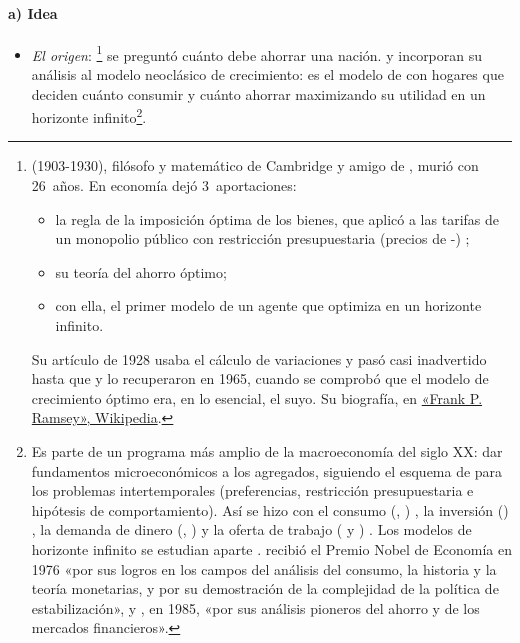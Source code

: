 \documentclass[11pt]{article}
\begin{document}
\paragraph{a) Idea}

\begin{itemize}
\item \emph{El origen}: \textcite{Ramsey1928}\footnote{ (1903-1930), filósofo y matemático de Cambridge y amigo de , murió con 26~años. En economía dejó 3~aportaciones:
\begin{itemize}
\item la regla de la imposición óptima de los bienes\nocite{Ramsey1927}, que \textcite{Boiteux1956Gestion} aplicó a las tarifas de un monopolio público con restricción presupuestaria (precios de -) ;
\item su teoría del ahorro óptimo;
\item con ella, el primer modelo de un agente que optimiza en un horizonte infinito.
\end{itemize}
Su artículo de 1928 usaba el cálculo de variaciones y pasó casi inadvertido hasta que  y  lo recuperaron en 1965, cuando se comprobó que el modelo de crecimiento óptimo era, en lo esencial, el suyo. Su biografía, en \href{https://es.wikipedia.org/wiki/Frank_P._Ramsey}{«Frank P. Ramsey», Wikipedia}.} se preguntó cuánto debe ahorrar una nación. \textcite{Cass1965} y \textcite{Koopmans1965} incorporan su análisis al modelo neoclásico de crecimiento: es el modelo de  con hogares que deciden cuánto consumir y cuánto ahorrar maximizando su utilidad en un horizonte infinito\footnote{Es parte de un programa más amplio de la macroeconomía del siglo XX: dar fundamentos microeconómicos a los agregados, siguiendo el esquema de  para los problemas intertemporales (preferencias, restricción presupuestaria e hipótesis de comportamiento). Así se hizo con el consumo (, ) , la inversión () , la demanda de dinero (, ) y la oferta de trabajo ( y ) . Los modelos de horizonte infinito se estudian aparte .  recibió el Premio Nobel de Economía en 1976 «por sus logros en los campos del análisis del consumo, la historia y la teoría monetarias, y por su demostración de la complejidad de la política de estabilización»\nocite{Nobel1976Friedman}, y , en 1985, «por sus análisis pioneros del ahorro y de los mercados financieros»\nocite{Nobel1985Modigliani}.}.

\end{itemize}
\end{document}
